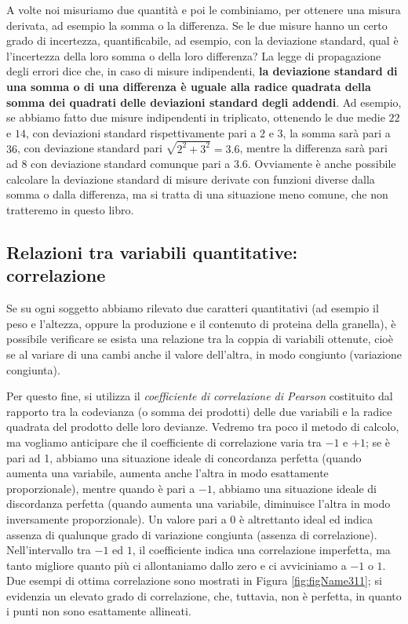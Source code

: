 \documentclass[a4paper,12pt,oneside]{book}
\begin{document}
A volte noi misuriamo due quantità e poi le combiniamo, per ottenere una misura derivata, ad esempio la somma o la differenza. Se le due misure hanno un certo grado di incertezza, quantificabile, ad esempio, con la deviazione standard, qual è l'incertezza della loro somma o della loro differenza? La legge di propagazione degli errori dice che, in caso di misure indipendenti, \textbf{la deviazione standard di una somma o di una differenza è uguale alla radice quadrata della somma dei quadrati delle deviazioni standard degli addendi}. Ad esempio, se abbiamo fatto due misure indipendenti in triplicato, ottenendo le due medie \(22\) e \(14\), con deviazioni standard rispettivamente pari a \(2\) e \(3\), la somma sarà pari a \(36\), con deviazione standard pari \(\sqrt{2^2 + 3^2} = 3.6\), mentre la differenza sarà pari ad \(8\) con deviazione standard comunque pari a \(3.6\). Ovviamente è anche possibile calcolare la deviazione standard di misure derivate con funzioni diverse dalla somma o dalla differenza, ma si tratta di una situazione meno comune, che non tratteremo in questo libro.

\hypertarget{relazioni-tra-variabili-quantitative-correlazione}{%
\subsection{Relazioni tra variabili quantitative: correlazione}\label{relazioni-tra-variabili-quantitative-correlazione}}

Se su ogni soggetto abbiamo rilevato due caratteri quantitativi (ad esempio il peso e l'altezza, oppure la produzione e il contenuto di proteina della granella), è possibile verificare se esista una relazione tra la coppia di variabili ottenute, cioè se al variare di una cambi anche il valore dell'altra, in modo congiunto (variazione congiunta).

Per questo fine, si utilizza il \emph{coefficiente di correlazione di Pearson} costituito dal rapporto tra la codevianza (o somma dei prodotti) delle due variabili e la radice quadrata del prodotto delle loro devianze. Vedremo tra poco il metodo di calcolo, ma vogliamo anticipare che il coefficiente di correlazione varia tra \(-1\) e \(+1\); se è pari ad 1, abbiamo una situazione ideale di concordanza perfetta (quando aumenta una variabile, aumenta anche l'altra in modo esattamente proporzionale), mentre quando è pari a \(-1\), abbiamo una situazione ideale di discordanza perfetta (quando aumenta una variabile, diminuisce l'altra in modo inversamente proporzionale). Un valore pari a \(0\) è altrettanto ideal ed indica assenza di qualunque grado di variazione congiunta (assenza di correlazione). Nell'intervallo tra \(-1\) ed \(1\), il coefficiente indica una correlazione imperfetta, ma tanto migliore quanto più ci allontaniamo dallo zero e ci avviciniamo a \(-1\) o \(1\). Due esempi di ottima correlazione sono mostrati in Figura \ref{fig:figName311}; si evidenzia un elevato grado di correlazione, che, tuttavia, non è perfetta, in quanto i punti non sono esattamente allineati.
\end{document}
